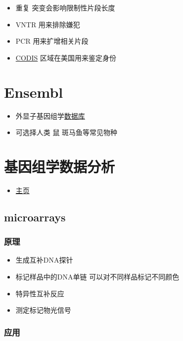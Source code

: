 \documentclass[]{book}
\providecommand{\tightlist}{%
  \setlength{\itemsep}{0pt}\setlength{\parskip}{0pt}}
\begin{document}
\begin{itemize}
\tightlist
\item
  重复 突变会影响限制性片段长度
\item
  VNTR 用来排除嫌犯
\item
  PCR 用来扩增相关片段
\item
  \href{http://www.fbi.gov/about-us/lab/biometric-analysis/codis}{CODIS} 区域在美国用来鉴定身份
\end{itemize}

\hypertarget{ensembl}{%
\section{Ensembl}\label{ensembl}}

\begin{itemize}
\tightlist
\item
  外显子基因组学\href{ensembl.org}{数据库}
\item
  可选择人类 鼠 斑马鱼等常见物种
\end{itemize}

\section{基因组学数据分析}

\begin{itemize}
\tightlist
\item
  \href{http://genomicsclass.github.io/book/}{主页}
\end{itemize}

\hypertarget{microarrays}{%
\subsection{microarrays}\label{microarrays}}

\subsubsection{原理}

\begin{itemize}
\tightlist
\item
  生成互补DNA探针
\item
  标记样品中的DNA单链 可以对不同样品标记不同颜色
\item
  特异性互补反应
\item
  测定标记物光信号
\end{itemize}

\hypertarget{-1}{%
\subsubsection{应用}\label{-1}}
\end{document}
